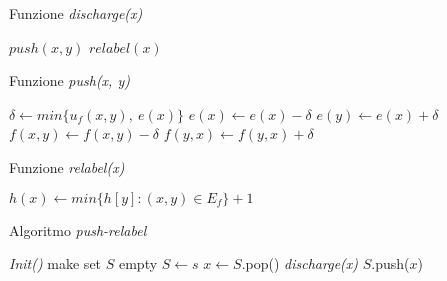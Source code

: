         \begin{algorithm}
            \caption{Funzione \textit{discharge(x)}}
            \begin{algorithmic}
                    \State $push(x,y)$
                \Else
                    \State $relabel(x)$
                \EndIf
            \end{algorithmic}
        \end{algorithm}

        \begin{algorithm}
            \caption{Funzione \textit{push(x, y)}}
            \begin{algorithmic}
                \State $\delta \gets min\{u_f(x,y),\ e(x)\}$
                \State $e(x) \gets e(x) - \delta$
                \State $e(y) \gets e(x) + \delta$
                \State $f(x,y) \gets f(x,y) - \delta$
                \State $f(y,x) \gets f(y,x) + \delta$
            \end{algorithmic}
        \end{algorithm}

        \begin{algorithm}
            \caption{Funzione \textit{relabel(x)}}
            \begin{algorithmic}
                \State $h(x) \gets min\{h[y]:(x,y) \in E_f \} + 1$
            \end{algorithmic}
        \end{algorithm}

        \begin{algorithm}
            \caption{Algoritmo \textit{push-relabel}}
            \begin{algorithmic}
                \State \textit{Init()}
                \State make set $S$ empty
                \State $S \gets s$
                    \State $x \gets S.$pop()
                    \State \textit{discharge(x)}
                        \State $S.$push($x$)
                    \EndIf
                \EndWhile
            \end{algorithmic}
        \end{algorithm}

